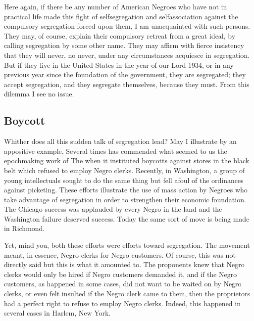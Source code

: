 \documentclass[letterpaper,10pt,english]{jupyterBook}
\begin{document}
\sphinxAtStartPar
Here again, if there be any number of American Negroes who have not in practical life made this fight of self\sphinxhyphen{}segregation and self\sphinxhyphen{}association against the compulsory segregation forced upon them, I am unacquainted with such persons. They may, of course, explain their compulsory retreat from a great ideal, by calling segregation by some other name. They may affirm with fierce insistency that they will never, no never, under any circumstances acquiesce in segregation. But if they live in the United States in the year of our Lord 1934, or in any previous year since the foundation of the government, they are segregated; they accept segregation, and they segregate themselves, because they must. From this dilemma I see no issue.


\subsection{Boycott}
\label{\detokenize{Volumes/41/04/segregation_in_the_north:boycott}}
\sphinxAtStartPar
Whither does all this sudden talk of segregation lead? May I illustrate by an appositive example. Several times  has commended what seemed to us the epoch\sphinxhyphen{}making work of The  when it instituted boycotts against stores in the black belt which refused to employ Negro clerks. Recently, in Washington, a group of young intellectuals sought to do the same thing but fell afoul of the ordinances against picketing. These efforts illustrate the use of mass action by Negroes who take advantage of segregation in order to strengthen their economic foundation. The Chicago success was applauded by every Negro in the land and the Washington failure deserved success. Today the same sort of move is being made in Richmond.

\sphinxAtStartPar
Yet, mind you, both these efforts were efforts toward segregation. The movement meant, in essence, Negro clerks for Negro customers. Of course, this was not directly said but this is what it amounted to. The proponents knew that Negro clerks would only be hired if Negro customers demanded it, and if the Negro customers, as happened in some cases, did not want to be waited on by Negro clerks, or even felt insulted if the Negro clerk came to them, then the proprietors had a perfect right to refuse to employ Negro clerks. Indeed, this happened in several cases in Harlem, New York.
\end{document}
